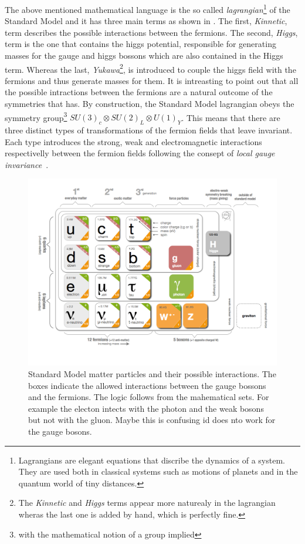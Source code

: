 The above mentioned mathematical language is the so called
{\it lagrangian}\footnote{Lagrangians are elegant equations that discribe the dynamics of a system. They are used both in classical
systems such as motions of planets and in the quantum world of tiny distances.}
of the Standard Model and it has three main terms as shown in . The first, {\it Kinnetic}, term describes the possible
interactions between the fermions. The second, {\it Higgs}, term is the one that contains the higgs potential, responsible for generating
masses for the gauge and higgs bossons which are also contained in the Higgs term.
Whereas the last,
{\it Yukawa}\footnote{The {\it Kinnetic} and {\it Higgs} terms appear more naturealy in the lagrangian wheras the last one is added by hand, which is perfectly fine.},
is introduced to couple the higgs field with the fermions and thus generate masses for them. It is intreasting to point out that all the possible intractions between the fermions are a natural outcome of the symmetries that
 has. By construction, the Standard Model lagrangian obeys the symmetry group\footnote{with the mathematical notion of a group implied}
$SU(3)_c\otimes SU(2)_L\otimes U(1)_Y$. This means that there are three distinct types of transformations of the fermion fields that leave 
invariant. Each type introduces the strong, weak and electromagnetic interactions respectivelly between the
fermion fields following the consept of {\it local gauge invariance}~\cite{aitchison}.

\begin{figure}[h]
  \begin{center}
    \includegraphics[trim=1.4cm 0cm 5.95cm 0cm, clip=true, width=\textwidth]{Figures/Chapter1/Standard_model_infographic.png}
    \caption{Standard Model matter particles and their possible interactions. The boxes indicate the allowed interactions
             between the gauge bossons and the fermions. The logic follows from the mahematical sets. For example the electon
             intects with the photon and the weak bosons but not with the gluon. {\color{red} Maybe this is confusing id does nto work for the gauge bosons.}}
    \label{sm_particles}
  \end{center}
\end{figure}

